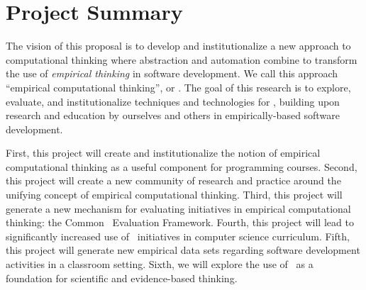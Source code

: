 
\section*{Project Summary}
\renewcommand{\thepage} {A--\arabic{page}}






  The vision of this proposal is to develop and
institutionalize a new approach to computational thinking where abstraction
and automation combine to transform the use of {\em empirical thinking} in
software development.  We call this approach ``empirical computational
thinking'', or \eCT.  The goal of this research is to explore, evaluate, and institutionalize
techniques and technologies for \eCT, building upon research and education
by ourselves and others in empirically-based software development.

\medskip

  First, this project will create and
institutionalize the notion of empirical computational thinking as a useful
component for programming courses. Second, this project will create a new
community of research and practice around the unifying concept of empirical
computational thinking.  Third, this project will generate a new mechanism
for evaluating initiatives in empirical computational thinking: the Common
\eCT\ Evaluation Framework. Fourth, this project will lead to significantly
increased use of \eCT\ initiatives in computer science curriculum. Fifth,
this project will generate new empirical data sets regarding software
development activities in a classroom setting. Sixth, we will explore the
use of \eCT\ as a foundation for scientific and evidence-based thinking.

